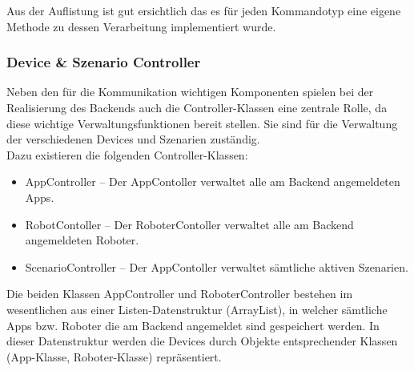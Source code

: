 Aus der Auflistung ist gut ersichtlich das es für jeden Kommandotyp eine eigene Methode zu dessen Verarbeitung implementiert wurde.
\subsubsection{Device \& Szenario Controller}
Neben den für die Kommunikation wichtigen Komponenten spielen bei der Realisierung des Backends auch die Controller-Klassen eine 
zentrale Rolle, da diese wichtige Verwaltungsfunktionen bereit stellen. Sie sind für die Verwaltung der verschiedenen Devices 
und Szenarien zuständig. \\
Dazu existieren die folgenden Controller-Klassen:
\begin{itemize}
	\item{AppController} -- Der AppContoller verwaltet alle am Backend angemeldeten Apps.
	\item{RobotContoller} -- Der RoboterContoller verwaltet alle am Backend angemeldeten Roboter.
	\item{ScenarioController} -- Der AppContoller verwaltet sämtliche aktiven Szenarien.
\end{itemize}
Die beiden Klassen AppController und RoboterController bestehen im wesentlichen aus einer Listen-Datenstruktur (ArrayList), in 
welcher sämtliche Apps bzw. Roboter die am Backend angemeldet sind gespeichert werden. In dieser Datenstruktur werden die Devices 
durch Objekte entsprechender Klassen (App-Klasse, Roboter-Klasse) repräsentiert. \\
